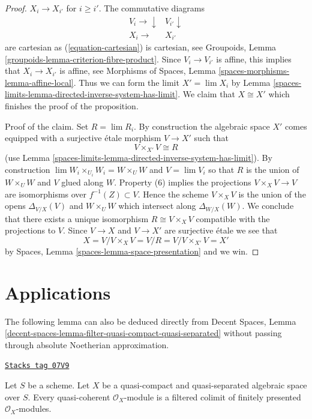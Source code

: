 \begin{proof}
$X_i \to X_{i'}$ for $i \geq i'$. The commutative diagrams
$$
\begin{array}{cc}V_i \longrightarrow\downarrow & V_{i'} \downarrow \\ X_i \longrightarrow & X_{i'}\end{array}
$$
are cartesian as (\ref{equation-cartesian}) is cartesian, see
Groupoids, Lemma \ref{groupoids-lemma-criterion-fibre-product}.
Since $V_i \to V_{i'}$ is affine, this implies that $X_i \to X_{i'}$
is affine, see
Morphisms of Spaces, Lemma \ref{spaces-morphisms-lemma-affine-local}.
Thus we can form the limit $X' = \lim X_i$ by
Lemma \ref{spaces-limits-lemma-directed-inverse-system-has-limit}.
We claim that $X \cong X'$ which finishes the proof of the proposition.

\medskip\noindent
Proof of the claim. Set $R = \lim R_i$.
By construction the algebraic space $X'$ comes
equipped with a surjective \'etale morphism $V \to X'$ such that
$$
V \times_{X'} V \cong R
$$
(use Lemma \ref{spaces-limits-lemma-directed-inverse-system-has-limit}).
By construction $\lim W_i \times_{U_i} W_i = W \times_U W$ and $V = \lim V_i$
so that $R$ is the union of $W \times_U W$ and $V$ glued along $W$.
Property (6) implies the projections $V \times_X V \to V$ are isomorphisms
over $f^{-1}(Z) \subset V$. Hence the scheme $V \times_X V$ is the union
of the opens $\Delta_{V/X}(V)$ and $W \times_U W$ which intersect
along $\Delta_{W/X}(W)$. We conclude that there exists a unique isomorphism
$R \cong V \times_X V$ compatible with the projections to $V$.
Since $V \to X$ and $V \to X'$ are surjective \'etale we see that
$$
X = V/ V \times_X V = V/R = V/V \times_{X'} V = X'
$$
by Spaces, Lemma \ref{spaces-lemma-space-presentation} and we win.
\end{proof}

\section{Applications}
\label{spaces-limits-section-applications}
The following lemma can also be deduced directly from
Decent Spaces, Lemma
\ref{decent-spaces-lemma-filter-quasi-compact-quasi-separated}
without passing through absolute Noetherian approximation.

\begin{lemma}
\label{spaces-limits-lemma-colimit-finitely-presented}
\href{https://stacks.math.columbia.edu/tag/07V9}{\texttt{Stacks tag 07V9}}

Let $S$ be a scheme. Let $X$ be a quasi-compact and quasi-separated algebraic
space over $S$. Every quasi-coherent $\mathcal{O}_X$-module is a
filtered colimit of finitely presented $\mathcal{O}_X$-modules.
\end{lemma}

